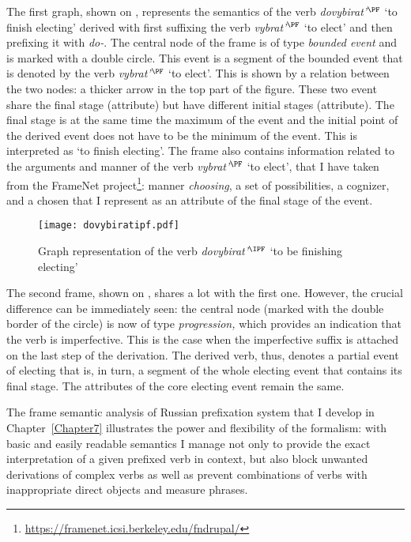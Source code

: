 The first graph, shown on , represents the semantics of the verb \textit{dovybirat'}$^{\PF}$ `to finish electing' derived with first suffixing the verb \textit{vybrat'}$^{\PF}$ `to elect' and then prefixing it with \textit{do-}. The central node of the frame is of type \textit{bounded event} and is marked with a double circle. This event is a segment of the bounded event that is denoted by the verb \textit{vybrat'}$^{\PF}$ `to elect'. This is shown by a relation between the two nodes: a thicker arrow in the top part of the figure. These two event share the final stage (\FIN attribute) but have different initial stages (\INIT attribute). The final stage is at the same time the maximum of the event and the initial point of the derived event does not have to be the minimum of the event. This is interpreted as `to finish electing'. The frame also contains information related to the arguments and manner of the verb \textit{vybrat'}$^{\PF}$ `to elect', that I have taken from the FrameNet project\footnote{\url{https://framenet.icsi.berkeley.edu/fndrupal/}}: manner \textit{choosing}, a set of possibilities, a cognizer, and a chosen that I represent as an attribute of the final stage of the event.

\begin{figure}
\texttt{[image: dovybiratipf.pdf]}
\caption{Graph representation of the verb \textit{dovybirat'}$^{\IPF}$ `to be finishing electing'\label{graph:ipf}}
\end{figure}

The second frame, shown on , shares a lot with the first one. However, the crucial difference can be immediately seen: the central node (marked with the double border of the circle) is now of type \textit{progression,} which provides an indication that the verb is imperfective. This is the case when the imperfective suffix is attached on the last step of the derivation. The derived verb, thus, denotes a partial event of electing that is, in turn, a segment of the whole electing event that contains its final stage. The attributes of the core electing event remain the same. 

The frame semantic analysis of Russian prefixation system that I develop in Chapter~\ref{Chapter7} illustrates the power and flexibility of the formalism: with basic and easily readable semantics I manage not only to provide the exact interpretation of a given prefixed verb in context, but also block unwanted derivations of complex verbs as well as prevent combinations of verbs with inappropriate direct objects and measure phrases.

